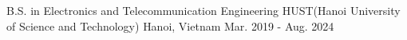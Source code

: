 

\begin{cventries}

  \cventry
    {B.S. in Electronics and Telecommunication Engineering} %
    {HUST(Hanoi University of Science and Technology)} %
    {Hanoi, Vietnam} %
    {Mar. 2019 - Aug. 2024} %
    {}

\end{cventries}
